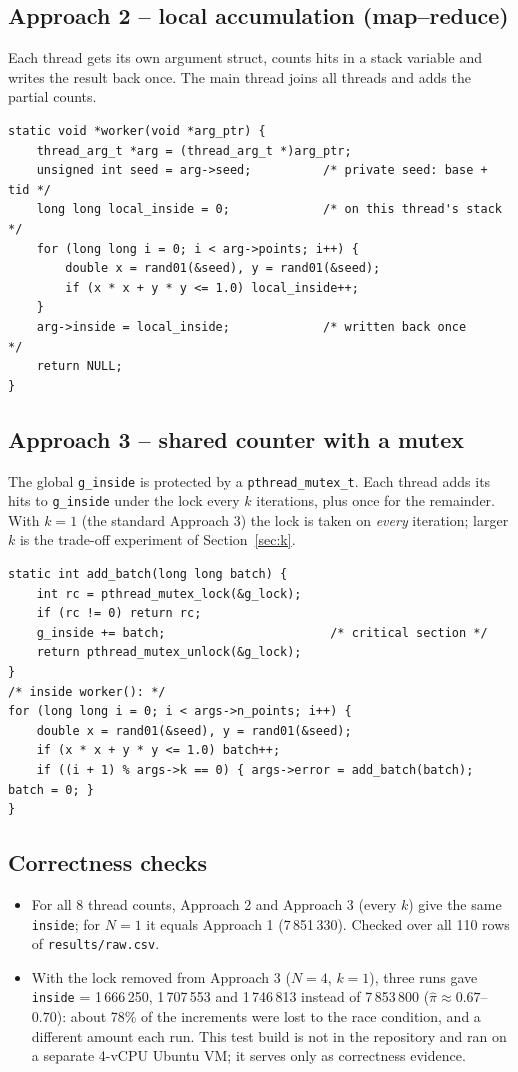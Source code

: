 \documentclass[11pt,a4paper]{article}
\newcommand{\code}[1]{\texttt{#1}}
\begin{document}
\subsection{Approach 2 -- local accumulation (map--reduce)}
Each thread gets its own argument struct, counts hits in a stack variable and writes the result back once. The main thread joins all threads and adds the partial counts.
\begin{lstlisting}[caption={Worker of Approach 2 (src/pi\_local.c)}]
static void *worker(void *arg_ptr) {
    thread_arg_t *arg = (thread_arg_t *)arg_ptr;
    unsigned int seed = arg->seed;          /* private seed: base + tid */
    long long local_inside = 0;             /* on this thread's stack   */
    for (long long i = 0; i < arg->points; i++) {
        double x = rand01(&seed), y = rand01(&seed);
        if (x * x + y * y <= 1.0) local_inside++;
    }
    arg->inside = local_inside;             /* written back once        */
    return NULL;
}
\end{lstlisting}

\subsection{Approach 3 -- shared counter with a mutex}
The global \code{g\_inside} is protected by a \code{pthread\_mutex\_t}. Each thread adds its hits to \code{g\_inside} under the lock every $k$ iterations, plus once for the remainder. With $k=1$ (the standard Approach 3) the lock is taken on \emph{every} iteration; larger $k$ is the trade-off experiment of Section~\ref{sec:k}.
\begin{lstlisting}[caption={Critical section and worker loop of Approach 3 (src/pi\_mutex.c)}]
static int add_batch(long long batch) {
    int rc = pthread_mutex_lock(&g_lock);
    if (rc != 0) return rc;
    g_inside += batch;                       /* critical section */
    return pthread_mutex_unlock(&g_lock);
}
/* inside worker(): */
for (long long i = 0; i < args->n_points; i++) {
    double x = rand01(&seed), y = rand01(&seed);
    if (x * x + y * y <= 1.0) batch++;
    if ((i + 1) % args->k == 0) { args->error = add_batch(batch); batch = 0; }
}
\end{lstlisting}

\subsection{Correctness checks}
\begin{itemize}[nosep]
  \item For all 8 thread counts, Approach 2 and Approach 3 (every $k$) give the same \code{inside}; for $N=1$ it equals Approach 1 (7\,851\,330). Checked over all 110 rows of \code{results/raw.csv}.
  \item With the lock removed from Approach 3 ($N=4$, $k=1$), three runs gave \code{inside} = 1\,666\,250, 1\,707\,553 and 1\,746\,813 instead of 7\,853\,800 ($\hat\pi\approx0.67$--$0.70$): about 78\% of the increments were lost to the race condition, and a different amount each run. This test build is not in the repository and ran on a separate 4-vCPU Ubuntu VM; it serves only as correctness evidence.
\end{itemize}
\end{document}
